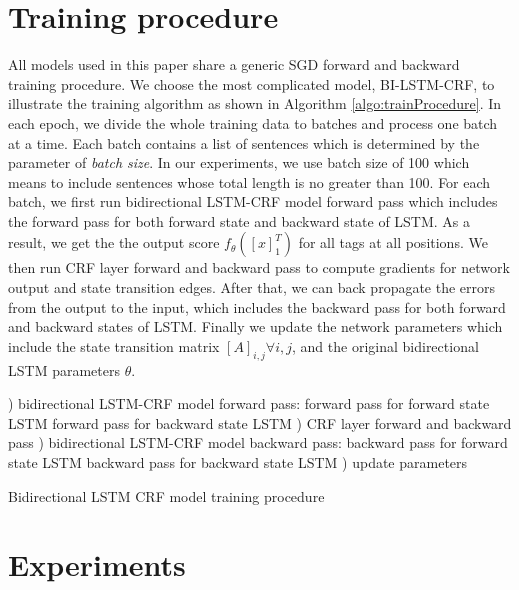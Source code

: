 \documentclass[11pt,a4paper]{article}
\begin{document}
\section{Training procedure} \label{sec:train}
All models used in this paper share a generic SGD forward and backward training procedure. We choose the most complicated model, BI-LSTM-CRF, to illustrate the training algorithm as shown in Algorithm \ref{algo:trainProcedure}.  In each epoch, we divide the whole training data to batches and process one batch at a time. Each batch contains a list of sentences which is determined by the parameter of \textit{batch size}. In our experiments, we use batch size of 100 which means to include sentences whose total length is no greater than 100. For each batch, we first run bidirectional LSTM-CRF model forward pass which includes the forward pass for both forward state and backward state of LSTM. As a result, we get the the output score $f_\theta([x]_1^T)$ for all tags at all positions. We then run CRF layer forward and backward pass to compute gradients for network output and state transition edges. After that, we can back propagate the errors from the output to the input, which includes the backward pass for both forward and backward states of LSTM. Finally we update the network parameters which include the state transition matrix $[A]_{i,j} \forall i, j$, and the original bidirectional LSTM parameters $\theta$. 
\begin{algorithm}[!hbt]
\small
\begin{algorithmic}[1]
     ) bidirectional LSTM-CRF model forward pass:
       \STATE\hspace{\algorithmicindent} forward pass for forward state LSTM
       \STATE\hspace{\algorithmicindent} forward pass for backward state LSTM
    ) CRF layer forward and backward pass
    ) bidirectional LSTM-CRF model backward pass:
       \STATE\hspace{\algorithmicindent} backward pass for forward state LSTM
       \STATE\hspace{\algorithmicindent} backward pass for backward state LSTM
    ) update parameters
 \ENDFOR  
\ENDFOR 
\end{algorithmic}
\caption{Bidirectional LSTM CRF model training procedure}\label{algo:trainProcedure}
\end{algorithm}

\section{Experiments} \label{sec:experiment}
\end{document}
